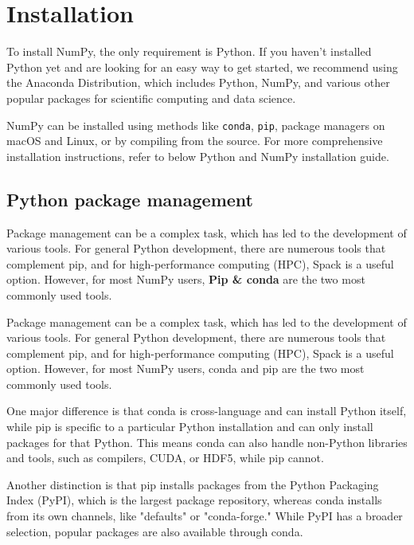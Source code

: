 \section{Installation}

To install NumPy, the only requirement is Python. If you haven't installed Python yet and are looking for an easy way to get started, we recommend using the Anaconda Distribution, which includes Python, NumPy, and various other popular packages for scientific computing and data science.

NumPy can be installed using methods like \texttt{conda}, \texttt{pip}, package managers on macOS and Linux, or by compiling from the source. For more comprehensive installation instructions, refer to below Python and NumPy installation guide.


\subsection{Python package management}
Package management can be a complex task, which has led to the development of various tools. For general Python development, there are numerous tools that complement pip, and for high-performance computing (HPC), Spack is a useful option. However, for most NumPy users, \textbf{Pip \& conda} are the two most commonly used tools.

\bigskip

Package management can be a complex task, which has led to the development of various tools. For general Python development, there are numerous tools that complement pip, and for high-performance computing (HPC), Spack is a useful option. However, for most NumPy users, conda and pip are the two most commonly used tools.

\bigskip

One major difference is that conda is cross-language and can install Python itself, while pip is specific to a particular Python installation and can only install packages for that Python. This means conda can also handle non-Python libraries and tools, such as compilers, CUDA, or HDF5, while pip cannot.

\bigskip

Another distinction is that pip installs packages from the Python Packaging Index (PyPI), which is the largest package repository, whereas conda installs from its own channels, like "defaults" or "conda-forge." While PyPI has a broader selection, popular packages are also available through conda.

